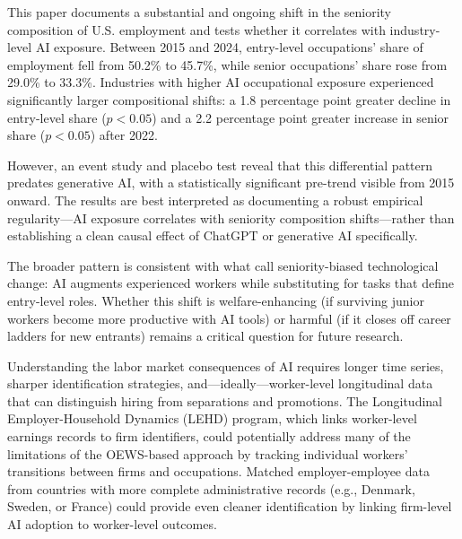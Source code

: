 \documentclass[12pt]{article}
\begin{document}
This paper documents a substantial and ongoing shift in the seniority composition of U.S. employment and tests whether it correlates with industry-level AI exposure. Between 2015 and 2024, entry-level occupations' share of employment fell from 50.2\% to 45.7\%, while senior occupations' share rose from 29.0\% to 33.3\%. Industries with higher AI occupational exposure experienced significantly larger compositional shifts: a 1.8 percentage point greater decline in entry-level share ($p < 0.05$) and a 2.2 percentage point greater increase in senior share ($p < 0.05$) after 2022.

However, an event study and placebo test reveal that this differential pattern predates generative AI, with a statistically significant pre-trend visible from 2015 onward. The results are best interpreted as documenting a robust empirical regularity---AI exposure correlates with seniority composition shifts---rather than establishing a clean causal effect of ChatGPT or generative AI specifically.

The broader pattern is consistent with what \citet{hosseini2025} call seniority-biased technological change: AI augments experienced workers while substituting for tasks that define entry-level roles. Whether this shift is welfare-enhancing (if surviving junior workers become more productive with AI tools) or harmful (if it closes off career ladders for new entrants) remains a critical question for future research.

Understanding the labor market consequences of AI requires longer time series, sharper identification strategies, and---ideally---worker-level longitudinal data that can distinguish hiring from separations and promotions. The Longitudinal Employer-Household Dynamics (LEHD) program, which links worker-level earnings records to firm identifiers, could potentially address many of the limitations of the OEWS-based approach by tracking individual workers' transitions between firms and occupations. Matched employer-employee data from countries with more complete administrative records (e.g., Denmark, Sweden, or France) could provide even cleaner identification by linking firm-level AI adoption to worker-level outcomes.
\end{document}

